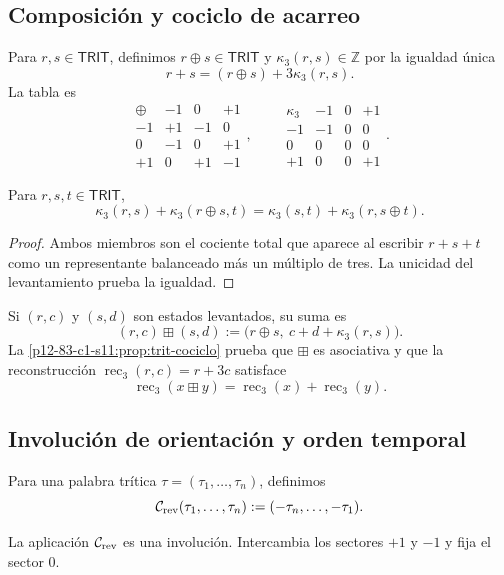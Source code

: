 \subsection{Composición y cociclo de acarreo}

Para \(r,s\in\mathsf{TRIT}\), definimos \(r\oplus s\in\mathsf{TRIT}\) y
\(\kappa_3(r,s)\in\mathbb Z\) por la igualdad única
\[
 r+s=(r\oplus s)+3\kappa_3(r,s).
\]
La tabla es
\[
\begin{array}{c|ccc}
\oplus&-1&0&+1\\\hline
-1&+1&-1&0\\
0&-1&0&+1\\
+1&0&+1&-1
\end{array},
\qquad
\begin{array}{c|ccc}
\kappa_3&-1&0&+1\\\hline
-1&-1&0&0\\
0&0&0&0\\
+1&0&0&+1
\end{array}.
\]

\begin{proposition}
\label{p12-83-c1-s11:prop:trit-cociclo}
Para \(r,s,t\in\mathsf{TRIT}\),
\[
 \kappa_3(r,s)+\kappa_3(r\oplus s,t)
 =\kappa_3(s,t)+\kappa_3(r,s\oplus t).
\]
\end{proposition}

\begin{proof}
Ambos miembros son el cociente total que aparece al escribir
\(r+s+t\) como un representante balanceado más un múltiplo de tres. La
unicidad del levantamiento prueba la igualdad.
\end{proof}

Si \((r,c)\) y \((s,d)\) son estados levantados, su suma es
\[
 (r,c)\boxplus(s,d)
 :=\bigl(r\oplus s,\ c+d+\kappa_3(r,s)\bigr).
\]
La \cref{p12-83-c1-s11:prop:trit-cociclo} prueba que \(\boxplus\) es asociativa y que la
reconstrucción \(\operatorname{rec}_3(r,c)=r+3c\) satisface
\[
 \operatorname{rec}_3(x\boxplus y)
 =\operatorname{rec}_3(x)+\operatorname{rec}_3(y).
\]

\subsection{Involución de orientación y orden temporal}

Para una palabra trítica \(\tau=(\tau_1,\ldots,\tau_n)\), definimos
\[
 \mathcal C_{\rm rev}(\tau_1,\ldots,\tau_n)
 :=(-\tau_n,\ldots,-\tau_1).
\]

\begin{lemma}
\label{p12-83-c1-s11:lem:trit-reversion}
La aplicación \(\mathcal C_{\rm rev}\) es una involución. Intercambia los
sectores \(+1\) y \(-1\) y fija el sector \(0\).
\end{lemma}

